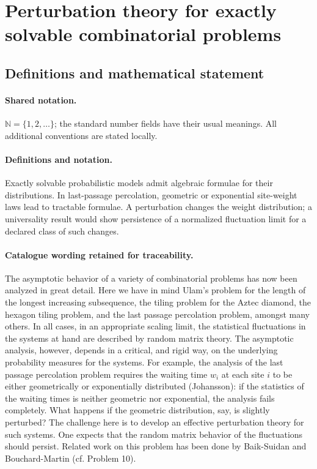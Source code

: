 \documentclass[11pt]{article}
\begin{document}
\section{Perturbation theory for exactly solvable combinatorial problems}\label{statement}

\subsection{Definitions and mathematical statement}

\paragraph{Shared notation.}$\mathbb N=\{1,2,\ldots\}$; the standard number fields have their usual meanings. All additional conventions are stated locally.


\paragraph{Definitions and notation.}Exactly solvable probabilistic models admit algebraic formulae for their distributions. In last-passage percolation, geometric or exponential site-weight laws lead to tractable formulae. A perturbation changes the weight distribution; a universality result would show persistence of a normalized fluctuation limit for a declared class of such changes.

\paragraph{Catalogue wording retained for traceability.}
The asymptotic behavior of a variety of combinatorial problems has now been analyzed in great detail. Here we have in mind Ulam's problem for the length of the longest increasing subsequence, the tiling problem for the Aztec diamond, the hexagon tiling problem, and the last passage percolation problem, amongst many others. In all cases, in an appropriate scaling limit, the statistical fluctuations in the systems at hand are described by random matrix theory. The asymptotic analysis, however, depends in a critical, and rigid way, on the underlying probability measures for the systems. For example, the analysis of the last passage percolation problem requires the waiting time $w_i$ at each site $i$ to be either geometrically or exponentially distributed (Johansson): if the statistics of the waiting times is neither geometric nor exponential, the analysis fails completely. What happens if the geometric distribution, say, is slightly perturbed? The challenge here is to develop an effective perturbation theory for such systems. One expects that the random matrix behavior of the fluctuations should persist. Related work on this problem has been done by Baik-Suidan and Bouchard-Martin (cf. Problem 10).
\end{document}
